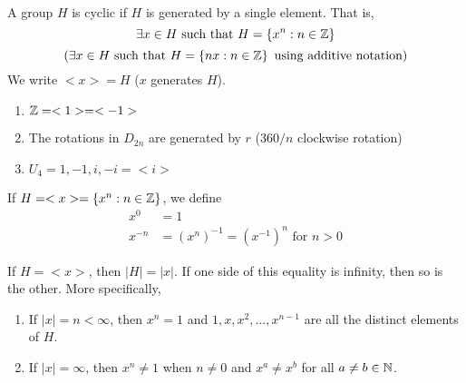\begin{definition} \leavevmode\\
    A group $H$ is cyclic if $H$ is generated by a single element. That is,
    $$\exists x \in H \text{ such that } H = \left\{x^n : n \in \mathbb{Z}\right\}$$
    $$\left(\exists x \in H \text{ such that } H = \left\{nx : n \in \mathbb{Z}\right\} \text{ using additive notation}\right)$$
    We write $<x> = H$ ($x$ generates $H$).
\end{definition}

\begin{example}
    \begin{enumerate}
        \item $\mathbb{Z}=<1>=<-1>$
        \item The rotations in $D_{2n}$ are generated by $r$ ($360/n$ clockwise rotation)
        \item $U_4 = {1, -1, i, -i} = <i>$
    \end{enumerate}
\end{example}

\begin{note}
    If $H=<x> = \left\{x^n : n \in \mathbb{Z}\right\}$, we define 
    \begin{align*}
        x^0 &= 1 \\
        x^{-n} &= (x^n)^{-1} = (x^{-1})^n \text{ for } n > 0
    \end{align*}
\end{note}

\begin{proposition}
    If $H=<x>$, then $|H| = |x|$. If one side of this equality is infinity, then so is the other. More specifically,
    \begin{enumerate}
        \item If $|x| = n < \infty$, then $x^n = 1$ and $1, x, x^2, ..., x^{n-1}$ are all the distinct elements of $H$.
        \item If $|x| = \infty$, then $x^n \not = 1$ when $n \not = 0$ and $x^a \not = x^b$ for all $a \not = b \in \mathbb{N}$.
    \end{enumerate}
\end{proposition}

